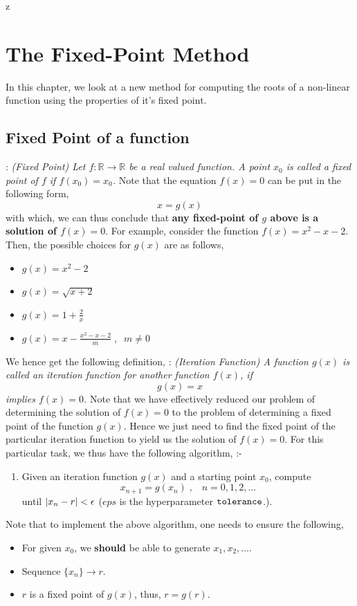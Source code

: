 z\documentclass[a4paper,12pt,twoside]{book}
\newcommand{\nll}[0]{\newline\newline}
\newcommand{\tit}[1]{\textit{#1}}
\newcommand{\algo}[0]{\boxed{\textbf{\textit{Algorithm}}}}
\newcommand{\defin}[0]{\boxed{\textbf{\textit{Definition}}}}
\DeclarePairedDelimiter\abs{\lvert}{\rvert}
\begin{document}
\chapter{The Fixed-Point Method}
In this chapter, we look at a new method for computing the roots of a non-linear function using the properties of it's fixed point.
\section{Fixed Point of a function}
\defin  : \tit{(Fixed Point) Let $f : \mathbb{R} \to \mathbb{R}$ be a real valued function. A point $x_0$ is called a fixed point of $f$ if $f(x_0) = x_0$.}
\nll
Note that the equation $f(x) = 0$ can be put in the following form,
\[ x = g(x) \]
with which, we can thus conclude that \textbf{any fixed-point of $g$ above is a solution of $f(x) = 0$}.
\nll
For example, consider the function $f(x) = x^2 - x - 2$. Then, the possible choices for $g(x)$ are as follows,
\begin{itemize}
    \item{$g(x) = x^2 - 2$} 
    \item{$g(x) = \sqrt{x+2}$}
    \item{$g(x) = 1 + \frac{2}{x}$}
    \item{$g(x) = x - \frac{x^2 - x - 2}{m} \;,\;\;m\neq 0$} 
\end{itemize}
We hence get the following definition,
\nll
\defin  : \tit{(Iteration Function) A function $g(x)$ is called an iteration function for another function $f(x)$, if 
\[g(x) = x\]
implies $f(x) = 0$.
}
\nll
Note that we have effectively reduced our problem of determining the solution of $f(x) = 0$ to the problem of determining a fixed point of the function $g(x)$. Hence we just need to find the fixed point of the particular iteration function to yield us the solution of $f(x) = 0$. For this particular task, we thus have the following algorithm,
\nll
\algo :-
\begin{enumerate}
    \item {Given an iteration function $g(x)$ and a starting point $x_0$, compute
    \[ x_{n+1} = g(x_n) \;,\;\;\; n = 0,1,2,\dots\]
    until $\abs{x_n - r} < \epsilon$ ($eps$ is the hyperparameter $\verb|tolerance|$.).
    }
\end{enumerate}
Note that to implement the above algorithm, one needs to ensure the following,
\begin{itemize}
    \item {For given $x_0$, we \textbf{should} be able to generate $x_1, x_2, \dots$.}
    \item{Sequence $\{x_n\} \to r$.}
    \item{$r$ is a fixed point of $g(x)$, thus, $r = g(r)$.}
\end{itemize}
\end{document}
